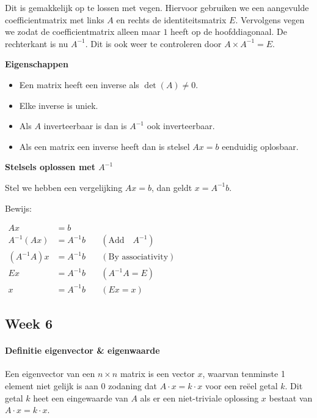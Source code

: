 \documentclass[11pt]{article}
\providecommand{\tightlist}{%
      \setlength{\itemsep}{0pt}\setlength{\parskip}{0pt}}
\begin{document}
Dit is gemakkelijk op te lossen met vegen. Hiervoor gebruiken we een
aangevulde coefficientmatrix met links \(A\) en rechts de
identiteitsmatrix \(E\). Vervolgens vegen we zodat de coefficientmatrix
alleen maar \(1\) heeft op de hoofddiagonaal. De rechterkant is nu
\(A^{-1}\). Dit is ook weer te controleren door \(A \times A^{-1} = E\).

    \textbf{Eigenschappen}

    \begin{itemize}
\tightlist
\item
  Een matrix heeft een inverse als \(\det(A)\not=0\).
\item
  Elke inverse is uniek.
\item
  Als \(A\) inverteerbaar is dan is \(A^{-1}\) ook inverteerbaar.
\item
  Als een matrix een inverse heeft dan is stelsel \(Ax=b\) eenduidig
  oplosbaar.
\end{itemize}

    \textbf{Stelsels oplossen met \(A^{-1}\)}

Stel we hebben een vergelijking \(Ax=b\), dan geldt \(x = A^{-1}b\).

Bewijs:

\(\begin{align} Ax &= b \\ A^{-1}(Ax)&=A^{-1}b \quad &(\text{Add} \quad A^{-1}) \\ (A^{-1}A)x&=A^{-1}b \quad &(\text{By associativity}) \\ Ex &= A^{-1}b \quad &( A^{-1}A=E )\\ x &= A^{-1}b \quad &(Ex=x) \end{align}\)

    \hypertarget{week-6}{%
\subsection{Week 6}\label{week-6}}

    \hypertarget{definitie-eigenvector-eigenwaarde}{%
\paragraph{Definitie eigenvector \&
eigenwaarde}\label{definitie-eigenvector-eigenwaarde}}

Een eigenvector van een \(n \times n\) matrix is een vector \(x\),
waarvan tenminste 1 element niet gelijk is aan 0 zodaning dat
\(A\cdot x=k \cdot x\) voor een reëel getal \(k\). Dit getal \(k\) heet
een eingewaarde van \(A\) als er een niet-triviale oplossing \(x\)
bestaat van \(A \cdot x = k \cdot x\).
\end{document}
